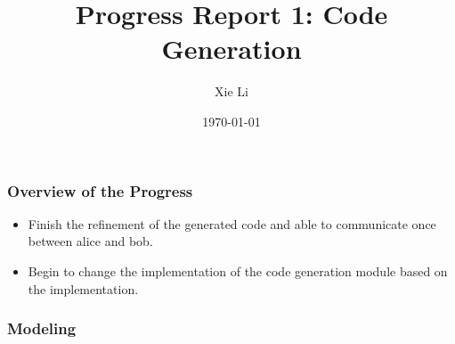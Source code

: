 \documentclass[11pt]{beamer}
\title{Progress Report 1: Code Generation}
\date{\today}
\author{Xie Li}
\begin{document}
\maketitle

\begin{frame}\frametitle{Overview of the Progress}
\begin{itemize}
\item Finish the refinement of the generated code and able to communicate once between alice and bob.

\item Begin to change the implementation of the code generation module based on the implementation.
\end{itemize}
\end{frame}

\begin{frame}\frametitle{Modeling}

\end{frame}
\end{document}
